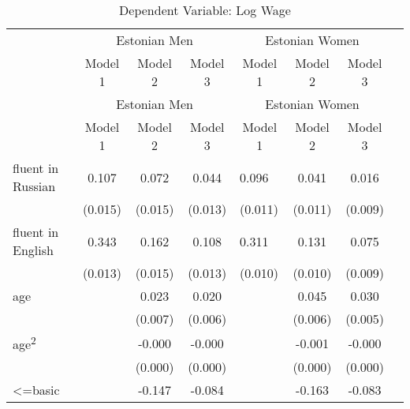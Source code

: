 	\begin{longtable}{l*{3}{c}|l*{3}{c}}
	\caption{Dependent Variable: Log Wage}\\
	\toprule
	& \multicolumn{3}{c|}{Estonian Men} & \multicolumn{3}{c}{Estonian Women} \\
	&\multicolumn{1}{c}{Model 1}&\multicolumn{1}{c}{Model 2}&\multicolumn{1}{c|}{Model 3}&\multicolumn{1}{c}{Model 1}&\multicolumn{1}{c}{Model 2}&\multicolumn{1}{c}{Model 3}\\ 
	\midrule
	\endfirsthead
	\toprule
	& \multicolumn{3}{c|}{Estonian Men} & \multicolumn{3}{c}{Estonian Women} \\
	&\multicolumn{1}{c}{Model 1}&\multicolumn{1}{c}{Model 2}&\multicolumn{1}{c|}{Model 3}&\multicolumn{1}{c}{Model 1}&\multicolumn{1}{c}{Model 2}&\multicolumn{1}{c}{Model 3}\\
	\midrule
	\endhead
	\midrule
	\endfoot
	\bottomrule
	\endlastfoot
	fluent in Russian   &       0.107\sym{***}&       0.072\sym{***}&       0.044\sym{***}&       0.096\sym{***}&       0.041\sym{***}&       0.016\sym{*}  \\
	&     (0.015)         &     (0.015)         &     (0.013)         &     (0.011)         &     (0.011)         &     (0.009)         \\
	fluent in English   &       0.343\sym{***}&       0.162\sym{***}&       0.108\sym{***}&       0.311\sym{***}&       0.131\sym{***}&       0.075\sym{***}\\
	&     (0.013)         &     (0.015)         &     (0.013)         &     (0.010)         &     (0.010)         &     (0.009)         \\
	age                 &                     &       0.023\sym{***}&       0.020\sym{***}&                     &       0.045\sym{***}&       0.030\sym{***}\\
	&                     &     (0.007)         &     (0.006)         &                     &     (0.006)         &     (0.005)         \\
	age\textsuperscript{2}    &                     &      -0.000\sym{***}&      -0.000\sym{***}&                     &      -0.001\sym{***}&      -0.000\sym{***}\\
	&                     &     (0.000)         &     (0.000)         &                     &     (0.000)         &     (0.000)         \\
	<=basic             &                     &      -0.147\sym{***}&      -0.084\sym{***}&                     &      -0.163\sym{***}&      -0.083\sym{***}\\

\end{longtable}

